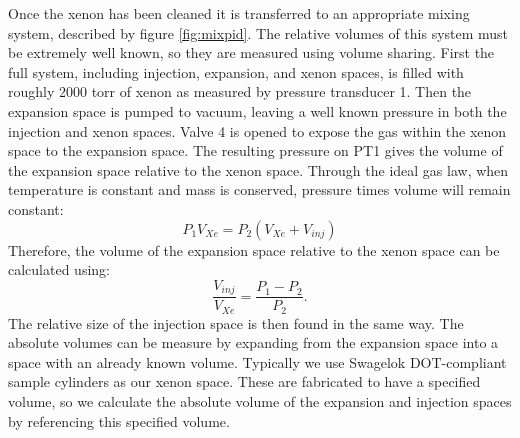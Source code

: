 \documentclass[12pt]{article}
\begin{document}
Once the xenon has been cleaned it is transferred to an appropriate mixing system, described by figure \ref{fig:mixpid}. The relative volumes of this system must be extremely well known, so they are measured using volume sharing. First the full system, including injection, expansion, and xenon spaces, is filled with roughly 2000 torr of xenon as measured by pressure transducer 1. Then the expansion space is pumped to vacuum, leaving a well known pressure in both the injection and xenon spaces. Valve 4 is opened to expose the gas within the xenon space to the expansion space. The resulting pressure on PT1 gives the volume of the expansion space relative to the xenon space. Through the ideal gas law, when temperature is constant and mass is conserved, pressure times volume will remain constant:
\begin{equation}
P_{1}V_{Xe} = P_{2}(V_{Xe}+V_{inj})
\end{equation}
Therefore, the volume of the expansion space relative to the xenon space can be calculated using:
\begin{equation}
\frac{V_{inj}}{V_{Xe}} = \frac{P_{1}-P_{2}}{P_{2}}.
\end{equation}
The relative size of the injection space is then found in the same way. The absolute volumes can be measure by expanding from the expansion space into a space with an already known volume. Typically we use Swagelok DOT-compliant sample cylinders as our xenon space. These are fabricated to have a specified volume, so we calculate the absolute volume of the expansion and injection spaces by referencing this specified volume.
\end{document}
